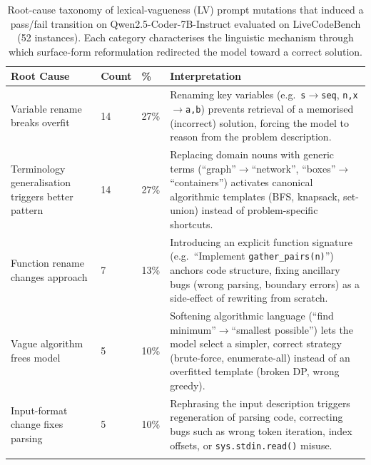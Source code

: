 \documentclass{article}
\begin{document}
\small

\begin{table}[ht]
\centering
\caption{Root-cause taxonomy of lexical-vagueness (LV) prompt mutations that induced a pass/fail transition on Qwen2.5-Coder-7B-Instruct evaluated on LiveCodeBench (52 instances). Each category characterises the linguistic mechanism through which surface-form reformulation redirected the model toward a correct solution.}
\label{tab:root-causes}
\begin{tabular}{p{4.0cm}p{1.0cm}p{1.0cm}p{8.4cm}}
\toprule
\textbf{Root Cause} & \textbf{Count} & \textbf{\%} & \textbf{Interpretation} \\
\midrule

\rowcolor[RGB]{220,235,255}
Variable rename breaks overfit &
14 & 27\% &
Renaming key variables (e.g.\ \texttt{s}$\to$\texttt{seq}, \texttt{n,x}$\to$\texttt{a,b}) prevents retrieval of a memorised (incorrect) solution, forcing the model to reason from the problem description. \\
\addlinespace[3pt]

\rowcolor[RGB]{220,255,220}
Terminology generalisation triggers better pattern &
14 & 27\% &
Replacing domain nouns with generic terms (``graph''$\to$``network'', ``boxes''$\to$``containers'') activates canonical algorithmic templates (BFS, knapsack, set-union) instead of problem-specific shortcuts. \\
\addlinespace[3pt]

\rowcolor[RGB]{240,220,255}
Function rename changes approach &
7 & 13\% &
Introducing an explicit function signature (e.g.\ ``Implement \texttt{gather\_pairs(n)}'') anchors code structure, fixing ancillary bugs (wrong parsing, boundary errors) as a side-effect of rewriting from scratch. \\
\addlinespace[3pt]

\rowcolor[RGB]{255,245,200}
Vague algorithm frees model &
5 & 10\% &
Softening algorithmic language (``find minimum''$\to$``smallest possible'') lets the model select a simpler, correct strategy (brute-force, enumerate-all) instead of an overfitted template (broken DP, wrong greedy). \\
\addlinespace[3pt]

\rowcolor[RGB]{255,225,210}
Input-format change fixes parsing &
5 & 10\% &
Rephrasing the input description triggers regeneration of parsing code, correcting bugs such as wrong token iteration, index offsets, or \texttt{sys.stdin.read()} misuse. \\
\addlinespace[3pt]


\end{tabular}
\end{table}
\end{document}
